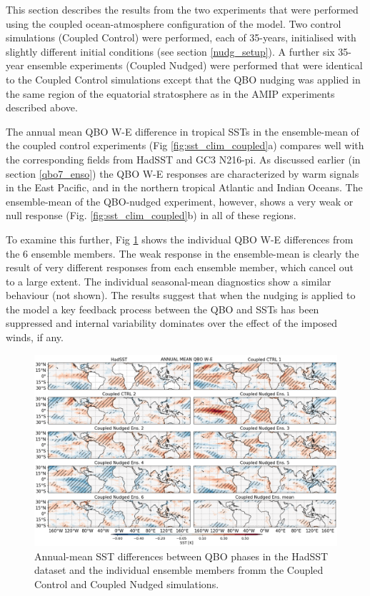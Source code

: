 This section describes the results from the two experiments that were performed using the coupled ocean-atmosphere configuration of the model. Two control simulations (Coupled Control) were performed, each of 35-years, initialised with slightly different initial conditions (see section \ref{nudg_setup}). A further six 35-year ensemble experiments (Coupled Nudged) were performed that were identical to the Coupled Control simulations except that the QBO nudging was applied in the same region of the equatorial stratosphere as in the AMIP experiments described above. 


The annual mean QBO W-E difference in tropical SSTs in the ensemble-mean of the coupled control experiments (Fig \ref{fig:sst_clim_coupled}a) compares well with the corresponding fields from HadSST and GC3 N216-pi. As discussed earlier (in section \ref{qbo7_enso}) the  QBO W-E responses are characterized by warm signals in the East  
Pacific, and in the northern tropical Atlantic and Indian Oceans.  
The ensemble-mean of the QBO-nudged experiment, however, shows a very weak or null response (Fig. \ref{fig:sst_clim_coupled}b) in all of these regions. 

To examine this further, Fig \ref{fig:sst_ens} shows the individual QBO W-E differences from the 6 ensemble members. The weak response in the ensemble-mean is clearly the result of very 
different responses from each ensemble member, which cancel out to a large extent. 
The individual seasonal-mean diagnostics show a similar behaviour (not shown). The results suggest that when the nudging is applied to the model a key feedback process between the QBO and SSTs has been suppressed and internal variability dominates over the effect of the imposed winds, if any. 

\begin{figure}[t!]
\centering
 \includegraphics[width=\linewidth]{figures/sst_check_climqbowqboe.png}
\caption[SST response in MAM to the QBO in coupled nudged experiments]{Annual-mean SST differences between QBO phases in the HadSST dataset and the individual ensemble members fromm the Coupled Control and Coupled Nudged simulations.}
\label{fig:sst_ens}
\end{figure}



